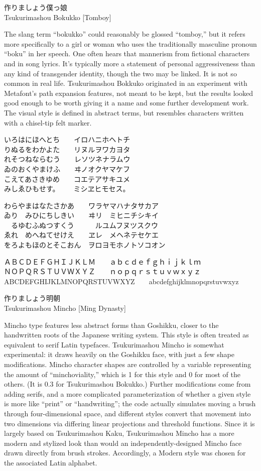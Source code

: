 \documentclass[14pt]{extarticle}
\newcommand{\iroha}{%
いろはにほへとち~~~~イロハニホヘトチ\\
りぬるをわかよた~~~~リヌルヲワカヨタ\\
れそつねならむう~~~~レソツネナラムウ\\
ゐのおくやまけふ~~~~ヰノオクヤマケフ\\
こえてあさきゆめ~~~~コエテアサキユメ\\
みしゑひもせす。~~~~ミシヱヒモセス。\par
}
\newcommand{\gojuuonzu}{%
わらやまはなたさかあ~~~~ワラヤマハナタサカア\\
ゐり~~みひにちしきい~~~~ヰリ~~ミヒニチシキイ\\
~~るゆむふぬつすくう~~~~~~ルユムフヌツスクウ\\
ゑれ~~めへねてせけえ~~~~ヱレ~~メヘネテセケエ\\
をろよもほのとそこおん~~ヲロヨモホノトソコオン\par
}
\begin{document}
\clearpage


\bokukko

\Large
作りましょう僕っ娘\\
Tsukurimashou Bokukko [Tomboy]

\normalsize

The slang term ``bokukko'' could reasonably be glossed ``tomboy,'' but
it refers more specifically to a girl or woman who
uses the traditionally masculine pronoun ``boku'' in her speech.  One often
hears that mannerism from fictional characters and in song lyrics.  It's
typically more a statement of personal aggressiveness than any kind of
transgender identity, though the two may be linked. It is not so common in
real life.  Tsukurimashou Bokkuko originated in an experiment with
Metafont's path expansion features, not meant to be kept, but the results
looked good enough to be worth giving it a name and some further development
work.  The visual style is defined in abstract terms, but resembles
characters written with a chisel-tip felt marker.

\bokukkomono
\iroha
\gojuuonzu

ＡＢＣＤＥＦＧＨＩＪＫＬＭ~~~~ａｂｃｄｅｆｇｈｉｊｋｌｍ\\
ＮＯＰＱＲＳＴＵＶＷＸＹＺ~~~~ｎｏｐｑｒｓｔｕｖｗｘｙｚ\\
ABCDEFGHIJKLMNOPQRSTUVWXYZ~~~~abcdefghijklmnopqrstuvwxyz

\clearpage


\mincho

\Large
作りましょう明朝\\
Tsukurimashou Mincho [Ming Dynasty]

\normalsize

Mincho type features less abstract forms than Goshikku, closer to the
handwritten roots of the Japanese writing system.  This style is often
treated as equivalent to serif Latin typefaces.  Tsukurimashou Mincho is
somewhat experimental: it draws heavily on the Goshikku face, with just a
few shape modifications.  Mincho character shapes are controlled by a
variable representing the amount of ``minchoviality,'' which is 1 for this
style and 0 for most of the others.  (It is 0.3 for Tsukurimashou Bokukko.)
Further modifications come from adding serifs, and a more complicated
parameterization of whether a given style is more like ``print'' or
``handwriting''; the code actually simulates moving a brush through
four-dimensional space, and different styles convert that movement into two
dimensions via differing linear projections and threshold functions. Since
it is largely based on Tsukurimashou Kaku, Tsukurimashou Mincho has a more
modern and stylized look than would an independently-designed Mincho face
drawn directly from brush strokes.  Accordingly, a Modern style was chosen
for the associated Latin alphabet.
\end{document}

